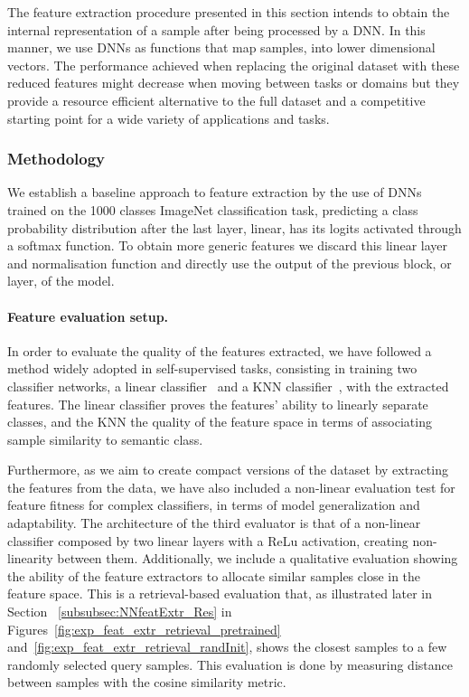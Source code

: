 The feature extraction procedure presented in this section intends to obtain the internal representation of a sample after being processed by a DNN. In this manner, we use DNNs as functions that map samples, into lower dimensional vectors. The performance achieved when replacing the original dataset with these reduced features might decrease when moving between tasks or domains but they provide a resource efficient alternative to the full dataset and a competitive starting point for a wide variety of applications and tasks.   

\subsubsection{Methodology}\label{subsubsec:NNfeatExtr_Meth}
We establish a baseline approach to feature extraction by the use of DNNs trained on the 1000 classes ImageNet classification task, predicting a class probability distribution after the last layer, linear, has its logits activated through a softmax function. To obtain more generic features we discard this linear layer and normalisation function and directly use the output of the previous block, or layer, of the model. 
                        
\paragraph{Feature evaluation setup.}
In order to evaluate the quality of the features extracted, we have followed a method widely adopted in self-supervised tasks, consisting in training two classifier networks, a linear classifier~\cite{2020_ICML_simple} and a KNN classifier~\cite{2018_CVPR_unsupervised}, with the extracted features.
The linear classifier proves the features' ability to linearly separate classes, and the KNN the quality of the feature space in terms of associating sample similarity to semantic class.

Furthermore, as we aim to create compact versions of the dataset by extracting the features from the data, we have also included a non-linear evaluation test for feature fitness for complex classifiers, in terms of model generalization and adaptability. The architecture of the third evaluator is that of  a non-linear classifier composed by two linear layers with a ReLu activation, creating non-linearity between them. Additionally, we include a qualitative evaluation showing the ability of the feature extractors to allocate similar samples close in the feature space. This is a retrieval-based evaluation that, as illustrated later in Section
~\ref{subsubsec:NNfeatExtr_Res} in Figures~\ref{fig:exp_feat_extr_retrieval_pretrained} and~\ref{fig:exp_feat_extr_retrieval_randInit}, shows the closest samples to a few randomly selected query samples. This evaluation is done by measuring distance between samples with the cosine similarity metric.


